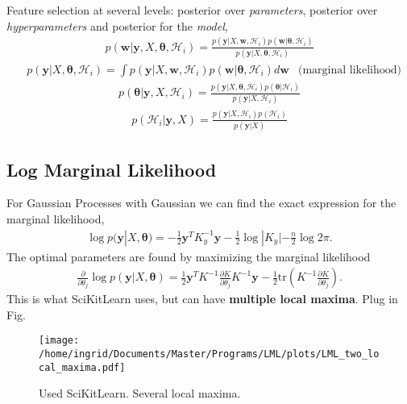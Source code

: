 \documentclass[twoside,english]{uiofysmaster}
\begin{document}
Feature selection at several levels: posterior over \textit{parameters}, posterior over \textit{hyperparameters} and posterior for the \textit{model},
\begin{align}
p(\textbf{w}| \textbf{y}, X, \boldsymbol{\theta}, \mathcal{H}_i) = \frac{p(\textbf{y} | X, \textbf{w}, \mathcal{H}_i) p(\textbf{w}|\boldsymbol{\theta}, \mathcal{H}_i)}{p(\textbf{y}|X, \boldsymbol{\theta}, \mathcal{H}_i)}
\end{align}
\begin{align}
&p(\textbf{y}|X, \boldsymbol{\theta}, \mathcal{H}_i) = \int p(\textbf{y} | X, \textbf{w}, \mathcal{H}_i)p(\textbf{w}| \boldsymbol{\theta}, \mathcal{H}_i) d \textbf{w} & \text{(marginal likelihood)}
\end{align}
\begin{align}
p( \boldsymbol{\theta}| \textbf{y}, X, \mathcal{H}_i) = \frac{p(\textbf{y} | X, \boldsymbol{\theta}, \mathcal{H}_i) p(\boldsymbol{\theta}| \mathcal{H}_i)}{p(\textbf{y}|X,  \mathcal{H}_i)}
\end{align}
\begin{align}
p(\mathcal{H}_i| \textbf{y}, X) = \frac{p(\textbf{y} | X, \mathcal{H}_i) p( \mathcal{H}_i)}{p(\textbf{y}|X)}
\end{align}

\subsection{Log Marginal Likelihood}

For Gaussian Processes with Gaussian we can find the exact expression for the marginal likelihood,
\begin{align}
\log p(\textbf{y}|X, \boldsymbol{\theta}) = - \frac{1}{2} \textbf{y}^T K_y^{-1} \textbf{y} - \frac{1}{2} \log |K_y| - \frac{n}{2} \log 2 \pi.
\end{align}
The optimal parameters are found by maximizing the marginal likelihood
\begin{align}
\frac{\partial}{\partial \theta_j}
 \log p(\textbf{y}|X, \boldsymbol{\theta}) = \frac{1}{2} \textbf{y}^T K^{-1} \frac{\partial K}{\partial \theta_j} K^{-1} \textbf{y} - \frac{1}{2} \text{tr} (K^{-1} \frac{\partial K}{\partial \theta_j}).
\end{align}
This is what SciKitLearn uses, but can have \textbf{multiple local maxima}. Plug in Fig. 

\begin{figure}
\centering
\texttt{[image: /home/ingrid/Documents/Master/Programs/LML/plots/LML\_two\_local\_maxima.pdf]}
\caption{Used SciKitLearn. Several local maxima.}
\end{figure}
\end{document}
